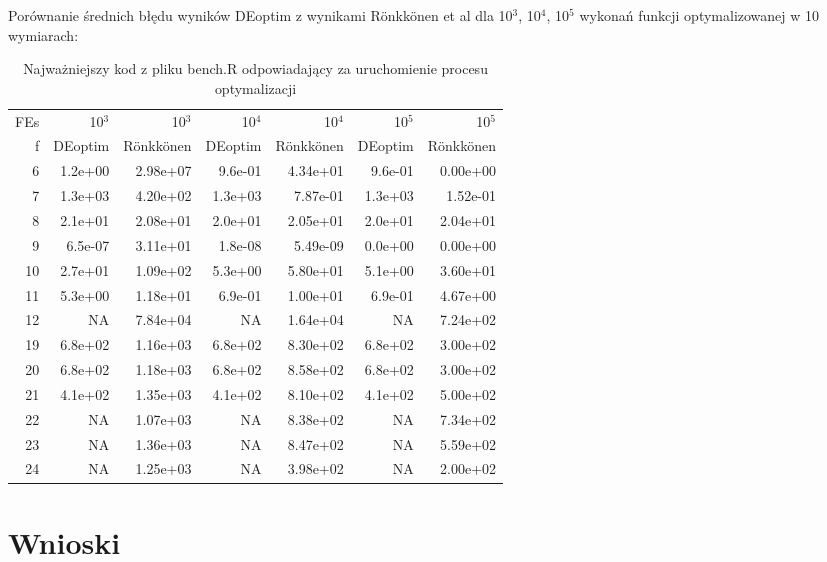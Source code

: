 \documentclass[11pt]{article}
\begin{document}
Porównanie średnich błędu wyników DEoptim z wynikami Rönkkönen et al
dla 10$^3$, 10$^4$, 10$^5$ wykonań funkcji optymalizowanej w 10 wymiarach:

\begin{table}[htb]
\caption[Plik bench.R]{Najważniejszy kod z pliku bench.R odpowiadający za uruchomienie procesu optymalizacji} \label{file:params}
\begin{center}
\begin{tabular}{rrrrrrr}
 FEs  &   10$^3$  &     10$^3$  &   10$^4$  &     10$^4$  &   10$^5$  &     10$^5$  \\
   f  &  DEoptim  &  Rönkkönen  &  DEoptim  &  Rönkkönen  &  DEoptim  &  Rönkkönen  \\
\hline
   6  &  1.2e+00  &   2.98e+07  &  9.6e-01  &   4.34e+01  &  9.6e-01  &   0.00e+00  \\
   7  &  1.3e+03  &   4.20e+02  &  1.3e+03  &   7.87e-01  &  1.3e+03  &   1.52e-01  \\
   8  &  2.1e+01  &   2.08e+01  &  2.0e+01  &   2.05e+01  &  2.0e+01  &   2.04e+01  \\
   9  &  6.5e-07  &   3.11e+01  &  1.8e-08  &   5.49e-09  &  0.0e+00  &   0.00e+00  \\
  10  &  2.7e+01  &   1.09e+02  &  5.3e+00  &   5.80e+01  &  5.1e+00  &   3.60e+01  \\
  11  &  5.3e+00  &   1.18e+01  &  6.9e-01  &   1.00e+01  &  6.9e-01  &   4.67e+00  \\
  12  &       NA  &   7.84e+04  &       NA  &   1.64e+04  &       NA  &   7.24e+02  \\
  19  &  6.8e+02  &   1.16e+03  &  6.8e+02  &   8.30e+02  &  6.8e+02  &   3.00e+02  \\
  20  &  6.8e+02  &   1.18e+03  &  6.8e+02  &   8.58e+02  &  6.8e+02  &   3.00e+02  \\
  21  &  4.1e+02  &   1.35e+03  &  4.1e+02  &   8.10e+02  &  4.1e+02  &   5.00e+02  \\
  22  &       NA  &   1.07e+03  &       NA  &   8.38e+02  &       NA  &   7.34e+02  \\
  23  &       NA  &   1.36e+03  &       NA  &   8.47e+02  &       NA  &   5.59e+02  \\
  24  &       NA  &   1.25e+03  &       NA  &   3.98e+02  &       NA  &   2.00e+02  \\
\end{tabular}
\end{center}
\end{table}
\section{Wnioski}
\label{sec-5}
\end{document}
